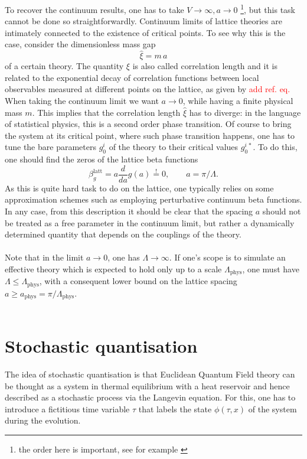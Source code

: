 To recover the continuum results, one has to take $V \to \infty, a \to 0$ \footnote{the order here is important, see for example \cite{seiler,friedli_velenik_2017}}, but this task cannot be done so straightforwardly.
Continuum limits of lattice theories are intimately connected to the existence of critical points. To see why this is the case, consider the dimensionless mass gap 
\begin{equation*}   
    \hat\xi = m \, a
\end{equation*} 
of a certain theory. The quantity $\xi$ is also called correlation length and it is related to the exponential decay of correlation functions between local observables measured
at different points on the lattice, as given by \textcolor{red}{add ref. eq.}\\
When taking the continuum limit we want $a \to 0$, while having a finite physical mass $m$. This implies that the correlation length $\hat \xi$ has to diverge: in the language of statistical physics, this is a second order phase transition. Of course to bring the system at its critical point, where such phase transition happens, one has to tune the bare parameters $g_0^i$ of the theory to their critical values $g_0^{i \, *}$. 
To do this, one should find the zeros of the lattice beta functions
\begin{equation*}
    \beta_g^\text{latt} = a \frac{d}{da} g(a) \overset{!}{=} 0, \qquad a = \pi/\Lambda.
\end{equation*}
As this is quite hard task to do on the lattice, one typically relies on some approximation schemes such as employing perturbative continuum beta functions. \\
In any case, from this description it should be clear that the spacing $a$ should not be treated as a free parameter in the continuum limit, but rather a dynamically determined quantity that depends on the couplings of the theory.\\~\\
Note that in the limit $a \to 0$, one has $\Lambda \to \infty$. If one's scope is to simulate an effective theory which is expected to hold only up to a scale $\Lambda_\text{phys}$, one must have $\Lambda \leq \Lambda_\text{phys}$, with a consequent lower bound on the lattice spacing $a \geq a_\text{phys} = \pi / \Lambda_\text{phys}$. \\ ~

\section{Stochastic quantisation}
\label{sec:stochastic_quantisation}
The idea of stochastic quantisation \cite{ParisiWu,Damgaard1987StochasticQuantization} is that Euclidean Quantum Field theory can be thought as a system in thermal equilibrium with a heat reservoir and hence described as a stochastic process via the Langevin equation. For this, one has to introduce a fictitious time variable $\tau$ that labels the state $\phi(\tau, x)$ of the system 
during the evolution. \\
